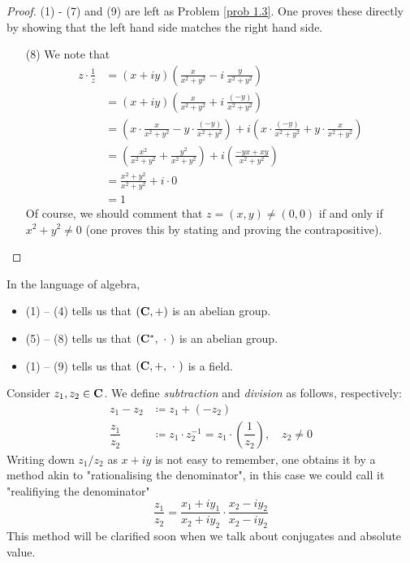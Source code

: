 \begin{proof}
(1) - (7) and (9) are left as Problem \ref{prob 1.3}. One proves these directly by showing that the left hand side matches the right hand side.
\begin{itemize}
\item[(8)] We note that
\begin{align*}
z\cdot\frac{1}{z} &= (x + iy)\left(\frac{x}{x^2 + y^2} - i\ \frac{y}{x^2 + y^2}\right)\\[1em]
&= (x + iy)\left(\frac{x}{x^2 + y^2} + i\ \frac{(-y)}{x^2 + y^2}\right)\\[1em]
&= \left(x\cdot\frac{x}{x^2 + y^2} - y\cdot\frac{(-y)}{x^2 + y^2}\right) + i\left(x\cdot\frac{(-y)}{x^2 + y^2} + y\cdot\frac{x}{x^2 + y^2}\right)\\[1em]
&= \left(\frac{x^2}{x^2 + y^2} + \frac{y^2}{x^2 + y^2}\right) + i\left(\frac{-yx + xy}{x^2 + y^2}\right)\\[1em]
&= \frac{x^2 + y^2}{x^2 + y^2} + i\cdot 0\\[1em]
&= 1
\end{align*}
Of course, we should comment that $z = (x,y) \neq (0,0)$ if and only if $x^2 + y^2 \neq 0$ (one proves this by stating and proving the contrapositive).
\end{itemize}
\vspace*{-\baselineskip}
\end{proof}

\vspace*{1.5em}

\begin{remark}
In the language of algebra, 
\begin{itemize}[leftmargin=*]
\item (1) -- (4) tells us that $(\mathbf C,+)$ is an abelian group.
\item (5) -- (8) tells us that $(\cc^*,\ \cdot\ )$ is an abelian group.
\item (1) -- (9) tells us that $(\cc,+,\ \cdot\ )$ is a field.
\end{itemize}
\end{remark}

\vspace*{1.5em}

\begin{definition}
Consider $z_1,z_2 \in \mathbf C$. We define \emph{subtraction} and \emph{division} as follows, respectively:
\begin{align*}
z_1 - z_2 &\coloneqq z_1 + (-z_2)\\[0.5em]
\dfrac{z_1}{z_2} &\coloneqq z_1\cdot z_2^{-1} = z_1\cdot \left(\dfrac{1}{z_2}\right),\quad z_2 \neq 0
\end{align*}
Writing down $z_1/z_2$ as $x+ iy$ is not easy to remember, one obtains it by a method akin to "rationalising the denominator", in this case we could call it "realifiying the denominator"
\[\frac{z_1}{z_2} = \frac{x_1 + iy_1}{x_2 + iy_2}\cdot \frac{x_2 - iy_2}{x_2 - iy_2}\]
This method will be clarified soon when we talk about conjugates and absolute value.
\end{definition}

